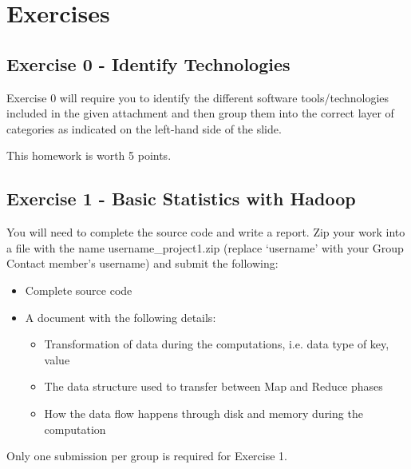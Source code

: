 \part{Exercises}\label{assignments}

\chapter{Exercise 0 - Identify Technologies}\label{assignment-0}

Exercise 0 will require you to identify the different software
tools/technologies included in the given attachment and then group them
into the correct layer of categories as indicated on the left-hand side
of the slide.

This homework is worth 5 points.


\chapter{Exercise 1 - Basic Statistics with Hadoop}\label{project-1}

You will need to complete the source code and write a report. Zip your
work into a file with the name username\_project1.zip (replace
`username' with your Group Contact member's username) and submit the
following:

\begin{itemize}
\item
  Complete source code
\item A document with the following details:
  \begin{itemize}
  \item
    Transformation of data during the computations, i.e. data type of
    key, value
  \item
    The data structure used to transfer between Map and Reduce phases
  \item
    How the data flow happens through disk and memory during the
    computation
  \end{itemize}
\end{itemize}

Only one submission per group is required for Exercise 1. 
\iffalse
It is due time at 11:59 pm on Feburary 5.
\fi

%

